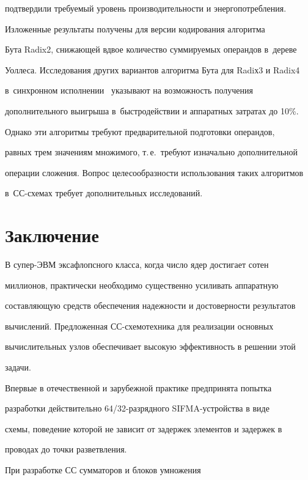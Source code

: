 подтвердили требуемый уровень производительности и энергопотребления.



      Изложенные результаты получены для версии кодирования алгоритма

Бута Radix2, снижающей вдвое количество суммируемых операндов в~дереве

Уоллеса. Исследования других вариантов алгоритма Бута для Radiх3 и Radix4

в~синхронном исполнении~\cite{19-st1} указывают на возможность получения

дополнительного выигрыша в~быстродействии и аппаратных затратах до 10\%.

Однако эти алгоритмы требуют предварительной подготовки операндов,

равных трем значениям множимого, т.\,е.\ требуют изначально дополнительной

операции сложения. Вопрос целесообразности использования таких алгоритмов

в~СС-схе\-мах требует дополнительных исследований.



\section{Заключение }



      В супер-ЭВМ эксафлопсного класса, когда число ядер достигает сотен

миллионов, практически необходимо существенно усиливать аппаратную

со\-став\-ля\-ющую средств обеспечения надежности и достоверности результатов

вычислений. Предложенная СС-схе\-мо\-тех\-ни\-ка для реализации основных

вычислительных узлов обеспечивает высокую эффективность в решении этой

задачи.



      Впервые в отечественной и зарубежной практике предпринята попытка

разработки действительно 64/32-раз\-ряд\-но\-го SIFMA-устрой\-ст\-ва в виде

схемы, поведение которой не зависит от задержек элементов и задержек в

проводах до точки разветвления.



      При разработке СС сумматоров и блоков умножения

